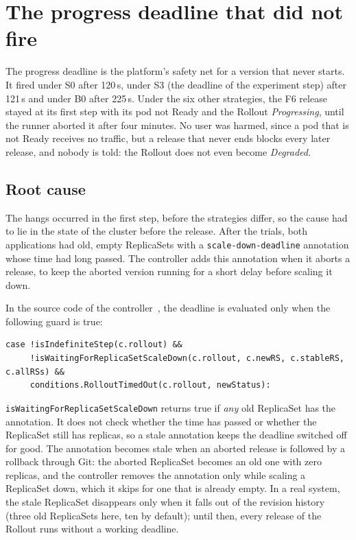 \section{The progress deadline that did not fire}
\label{sec:EvalDeadline}
The progress deadline is the platform's safety net for a version that never starts. It fired under S0 after 120\,s, under S3 (the deadline of the experiment step) after 121\,s and under B0 after 225\,s. Under the six other strategies, the F6 release stayed at its first step with its pod not Ready and the Rollout \emph{Progressing}, until the runner aborted it after four minutes. No user was harmed, since a pod that is not Ready receives no traffic, but a release that never ends blocks every later release, and nobody is told: the Rollout does not even become \emph{Degraded}.

\subsection{Root cause}
\label{sec:EvalDeadlineCause}
The hangs occurred in the first step, before the strategies differ, so the cause had to lie in the state of the cluster before the release. After the trials, both applications had old, empty ReplicaSets with a \texttt{scale-down-deadline} annotation whose time had long passed. The controller adds this annotation when it aborts a release, to keep the aborted version running for a short delay before scaling it down.

In the source code of the controller~\cite{ArgoRolloutsSource}, the deadline is evaluated only when the following guard is true:
\begin{lstlisting}[caption={The guard of the progress-deadline check in rollout/sync.go (Argo Rollouts v1.10.1).},label=lst:EvalGuard]
case !isIndefiniteStep(c.rollout) &&
     !isWaitingForReplicaSetScaleDown(c.rollout, c.newRS, c.stableRS, c.allRSs) &&
     conditions.RolloutTimedOut(c.rollout, newStatus):
\end{lstlisting}
\texttt{isWaitingForReplicaSetScaleDown} returns true if \emph{any} old ReplicaSet has the annotation. It does not check whether the time has passed or whether the ReplicaSet still has replicas, so a stale annotation keeps the deadline switched off for good. The annotation becomes stale when an aborted release is followed by a rollback through Git: the aborted ReplicaSet becomes an old one with zero replicas, and the controller removes the annotation only while scaling a ReplicaSet down, which it skips for one that is already empty. In a real system, the stale ReplicaSet disappears only when it falls out of the revision history (three old ReplicaSets here, ten by default); until then, every release of the Rollout runs without a working deadline.

